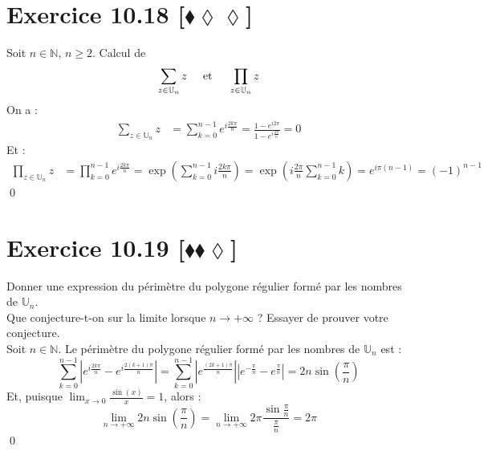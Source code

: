 \documentclass[10pt]{article}
\begin{document}

\section*{Exercice 10.18 [$\blacklozenge\lozenge\lozenge$]}
\begin{tcolorbox}[enhanced, width=7in, center, size=fbox, fontupper=\large, drop shadow southwest]
    Soit $n\in\mathbb{N}$, $n\geq2$. Calcul de
    \begin{equation*}
        \sum_{z\in\mathbb{U}_n}{z} \hspace{0.5cm} \text{et} \hspace{0.5cm} \prod_{z\in\mathbb{U}_n}z
    \end{equation*}
    On a :
    \begin{align*}
        \sum_{z\in\mathbb{U}_n}{z}&=\sum_{k=0}^{n-1}{e^{i\frac{2k\pi}{n}}}=\frac{1-e^{i2\pi}}{1-e^{i\frac{2\pi}{n}}}=0
    \end{align*}
    Et :
    \begin{align*}
        \prod_{z\in\mathbb{U}_n}{z}&=\prod_{k=0}^{n-1}{e^{i\frac{2k\pi}{n}}}=\exp\left( \sum_{k=0}^{n-1}{i\frac{2k\pi}{n}} \right) = \exp\left( i\frac{2\pi}{n}\sum_{k=0}^{n-1}{k} \right)=e^{i\pi(n-1)}=(-1)^{n-1}
    \end{align*}
    \qed
\end{tcolorbox}


\section*{Exercice 10.19 [$\blacklozenge\blacklozenge\lozenge$]}
\begin{tcolorbox}[enhanced, width=7in, center, size=fbox, fontupper=\large, drop shadow southwest]
    Donner une expression du périmètre du polygone régulier formé par les nombres de $\mathbb{U}_n$.\\
    Que conjecture-t-on sur la limite lorsque $n\to+\infty$ ? Essayer de prouver votre conjecture.\\[0.2cm]
    Soit $n\in\mathbb{N}$. Le périmètre du polygone régulier formé par les nombres de $\mathbb{U}_n$ est :
    \begin{equation*}
        \sum_{k=0}^{n-1}{|e^{i\frac{2k\pi}{n}} - e^{i\frac{2(k+1)\pi}{n}}|}=\sum_{k=0}^{n-1}{|e^{\frac{(2k+1)\pi}{n}}||e^{-\frac{\pi}{n}} - e^{\frac{\pi}{n}}|}=2n\sin\left( \frac{\pi}{n} \right)
    \end{equation*}
    Et, puisque $\lim_{x\to0}{\frac{\sin(x)}{x}}=1$, alors :
    \begin{equation*}
        \lim_{n\to+\infty}{2n\sin\left(\frac{\pi}{n}\right)}=\lim_{n\to+\infty}2\pi\frac{\sin\frac{\pi}{n}}{\frac{\pi}{n}}=2\pi
    \end{equation*}
    \qed
\end{tcolorbox}
\end{document}
